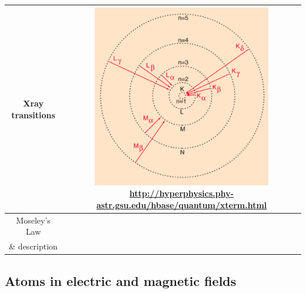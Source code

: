 
\begin{tabular}{|c|c|}
\hline

Xray transitions & \begin{minipage}{.5\textwidth}
      \includegraphics[width=\linewidth, height=80mm]{images/XrayTransitions.png}
      \tiny \url{http://hyperphysics.phy-astr.gsu.edu/hbase/quantum/xterm.html}
    \end{minipage}

\\ \hline

Moseley's Law & \\
\& description & 

\\ \hline
\end{tabular}
\flushleft


\subsection{Atoms in electric and magnetic fields} 
